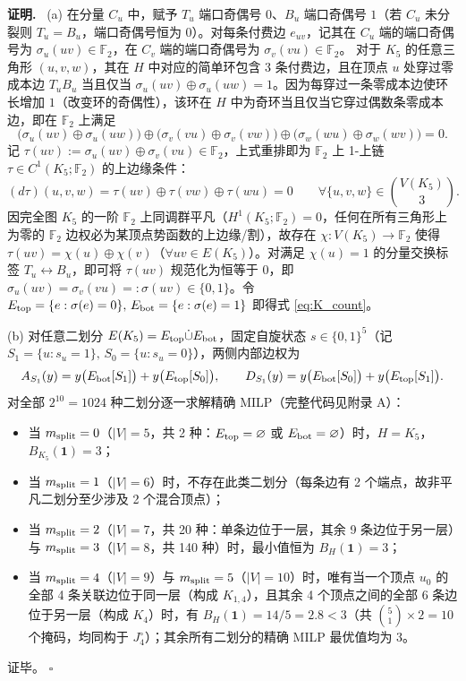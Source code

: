 \documentclass[11pt,a4paper]{ctexart}
\theoremstyle{definition}
\newenvironment{proofcn}{\par\noindent\textbf{证明.}\ }{\hfill$\square$\par}
\newcommand{\FF}{\mathbb F}
\newcommand{\1}{\boldsymbol 1}
\newcommand{\0}{\boldsymbol 0}
\begin{document}
\begin{proofcn}
(a) 在分量 $C_u$ 中，赋予 $T_u$ 端口奇偶号 $0$、$B_u$ 端口奇偶号 $1$（若 $C_u$ 未分裂则 $T_u=B_u$，端口奇偶号恒为 $0$）。对每条付费边 $e_{uv}$，记其在 $C_u$ 端的端口奇偶号为 $\sigma_u(uv)\in\FF_2$，在 $C_v$ 端的端口奇偶号为 $\sigma_v(vu)\in\FF_2$。
对于 $K_5$ 的任意三角形 $(u,v,w)$，其在 $H$ 中对应的简单环包含 3 条付费边，且在顶点 $u$ 处穿过零成本边 $T_uB_u$ 当且仅当 $\sigma_u(uv)\oplus\sigma_u(uw)=1$。因为每穿过一条零成本边使环长增加 $1$（改变环的奇偶性），该环在 $H$ 中为奇环当且仅当它穿过偶数条零成本边，即在 $\FF_2$ 上满足
\[
 \bigl(\sigma_u(uv)\oplus\sigma_u(uw)\bigr)\oplus\bigl(\sigma_v(vu)\oplus\sigma_v(vw)\bigr)\oplus\bigl(\sigma_w(wu)\oplus\sigma_w(wv)\bigr)=0.
\]
记 $\tau(uv):=\sigma_u(uv)\oplus\sigma_v(vu)\in\FF_2$，上式重排即为 $\FF_2$ 上 1-上链 $\tau\in C^1(K_5;\FF_2)$ 的上边缘条件：
\[
 (d\tau)(u,v,w) = \tau(uv)\oplus\tau(vw)\oplus\tau(wu) = 0 \qquad \forall \{u,v,w\}\in\binom{V(K_5)}{3}.
\]
因完全图 $K_5$ 的一阶 $\FF_2$ 上同调群平凡（$H^1(K_5;\FF_2)=0$，任何在所有三角形上为零的 $\FF_2$ 边权必为某顶点势函数的上边缘/割），故存在 $\chi:V(K_5)\to\FF_2$ 使得 $\tau(uv)=\chi(u)\oplus\chi(v)$（$\forall uv\in E(K_5)$）。对满足 $\chi(u)=1$ 的分量交换标签 $T_u\leftrightarrow B_u$，即可将 $\tau(uv)$ 规范化为恒等于 $0$，即 $\sigma_u(uv)=\sigma_v(vu)=:\sigma(uv)\in\{0,1\}$。令 $E_{\rm top}=\{e:\sigma(e)=0\},\, E_{\rm bot}=\{e:\sigma(e)=1\}$ 即得式 \eqref{eq:K_count}。

(b) 对任意二划分 $E(K_5)=E_{\rm top}\dot\cup E_{\rm bot}$，固定自旋状态 $s\in\{0,1\}^5$（记 $S_1=\{u:s_u=1\},\, S_0=\{u:s_u=0\}$），两侧内部边权为
\[
 A_{S_1}(y)=y\bigl(E_{\rm bot}[S_1]\bigr)+y\bigl(E_{\rm top}[S_0]\bigr),\qquad
 D_{S_1}(y)=y\bigl(E_{\rm bot}[S_0]\bigr)+y\bigl(E_{\rm top}[S_1]\bigr).
\]
对全部 $2^{10}=1024$ 种二划分逐一求解精确 MILP（完整代码见附录 A）：
\begin{itemize}
\item 当 $m_{\rm split}=0$（$|V|=5$，共 2 种：$E_{\rm top}=\varnothing$ 或 $E_{\rm bot}=\varnothing$）时，$H=K_5$，$B_{K_5}(\1)=3$；
\item 当 $m_{\rm split}=1$（$|V|=6$）时，不存在此类二划分（每条边有 2 个端点，故非平凡二划分至少涉及 2 个混合顶点）；
\item 当 $m_{\rm split}=2$（$|V|=7$，共 20 种：单条边位于一层，其余 9 条边位于另一层）与 $m_{\rm split}=3$（$|V|=8$，共 140 种）时，最小值恒为 $B_H(\1)=3$；
\item 当 $m_{\rm split}=4$（$|V|=9$）与 $m_{\rm split}=5$（$|V|=10$）时，唯有当一个顶点 $u_0$ 的全部 4 条关联边位于同一层（构成 $K_{1,4}$），且其余 4 个顶点之间的全部 6 条边位于另一层（构成 $K_4$）时，有 $B_H(\1)=14/5=2.8<3$（共 $\binom{5}{1}\times 2=10$ 个掩码，均同构于 $J_4^\circ$）；其余所有二划分的精确 MILP 最优值均为 $3$。
\end{itemize}
证毕。
\end{proofcn}
\end{document}
